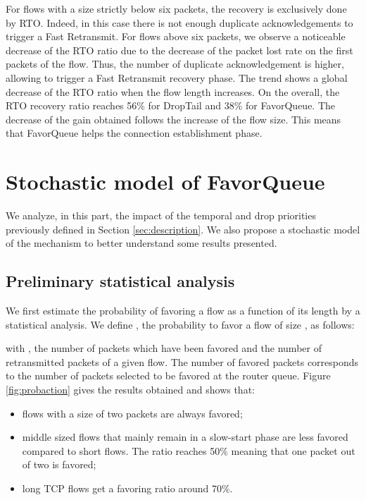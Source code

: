 \documentclass{elsart}
\begin{document}
For flows with a size strictly below six packets, the recovery is exclusively done by RTO. Indeed, in this case there is not enough duplicate acknowledgements to trigger a Fast Retransmit.
For flows above six packets, we observe a noticeable decrease of the RTO ratio due to the decrease of the packet lost rate on the first packets of the flow. Thus, the number of duplicate acknowledgement is higher, allowing to
trigger a Fast Retransmit recovery phase. The trend shows a global decrease of the RTO ratio when the flow length increases. 
On the overall, the RTO recovery ratio reaches 56\% for DropTail and 38\% for FavorQueue.
The decrease of the gain obtained follows the increase of the flow size. This means that FavorQueue helps the connection establishment phase.

\section{Stochastic model of FavorQueue}
\label{sec:model}

We analyze, in this part, the impact of the temporal and drop priorities previously defined in Section \ref{sec:description}. We also propose a stochastic model of the mechanism to better understand some results presented. 

\subsection{Preliminary statistical analysis}

We first estimate the probability of favoring a flow as a function of its length by a statistical analysis. We define , the probability to favor a flow of size , as follows:

 

with , the number of packets which have been favored and  the number of retransmitted packets of a given  flow.
The number of favored packets corresponds to the number of packets selected to be favored at the router queue.
Figure \ref{fig:probaction} gives the results obtained and shows that:

\begin{itemize}
\item flows with a size of two packets are always favored; 
\item middle sized flows that mainly remain in a slow-start phase are less favored compared to short flows. The ratio reaches 50\% meaning that one packet out of two is favored; 
\item long TCP flows get a favoring ratio around 70\%. 
\end{itemize} 
\end{document}
